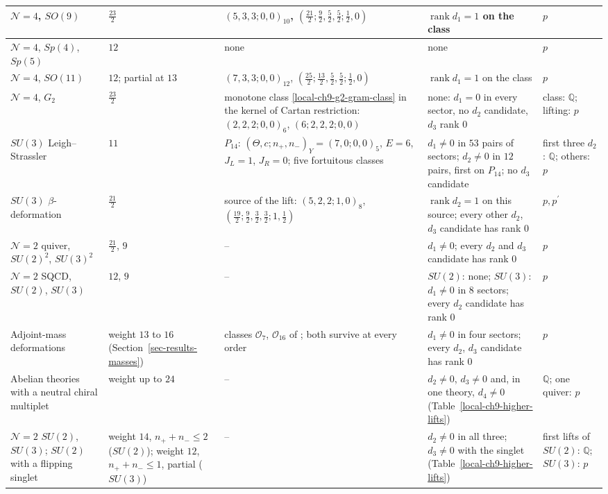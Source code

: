 \documentclass[11pt]{article}
\numberwithin{equation}{section}
\numberwithin{figure}{section}
\numberwithin{table}{section}
\begin{document}
{\begin{xltabular}{\linewidth}{|>{\raggedright\arraybackslash}p{2.3cm}|>{\raggedright\arraybackslash}p{2.2cm}|>{\raggedright\arraybackslash}X|>{\raggedright\arraybackslash}X|>{\raggedright\arraybackslash}p{1.75cm}|}
\hline
$\mathcal N=4$, $SO(9)$ & $\tfrac{23}2$ & $(5,3,3;0,0)_{10}$, $(\tfrac{21}2;\tfrac92,\tfrac52,\tfrac52;\tfrac12,0)$ & $\operatorname{rank}d_1=1$ on the class & $p$\\
\hline
$\mathcal N=4$, $Sp(4)$, $Sp(5)$ & $12$ & none & none & $p$\\
\hline
$\mathcal N=4$, $SO(11)$ & $12$; partial at $13$ & $(7,3,3;0,0)_{12}$, $(\tfrac{25}2;\tfrac{13}2,\tfrac52,\tfrac52;\tfrac12,0)$ & $\operatorname{rank}d_1=1$ on the class & $p$\\
\hline
$\mathcal N=4$, $G_2$ & $\tfrac{23}2$ & monotone class \eqref{local-ch9-g2-gram-class} in the kernel of Cartan restriction: $(2,2,2;0,0)_6$, $(6;2,2,2;0,0)$ & none: $d_1=0$ in every sector, no $d_2$ candidate, $d_3$ rank $0$ & class: $\mathbb Q$; lifting: $p$\\
\hline
$SU(3)$ Leigh--Strassler & $11$ & $P_{14}$: $(\Theta,c;n_+,n_-)_Y=(7,0;0,0)_5$, $E=6$, $J_L=1$, $J_R=0$; five fortuitous classes & $d_1\ne0$ in $53$ pairs of sectors; $d_2\ne0$ in $12$ pairs, first on $P_{14}$; no $d_3$ candidate & first three $d_2$: $\mathbb Q$; others: $p$\\
\hline
$SU(3)$ $\beta$-deformation & $\tfrac{21}2$ & source of the lift: $(5,2,2;1,0)_8$, $(\tfrac{19}2;\tfrac92,\tfrac32,\tfrac32;1,\tfrac12)$ & $\operatorname{rank}d_2=1$ on this source; every other $d_2$, $d_3$ candidate has rank $0$ & $p,p^{\prime}$\\
\hline
$\mathcal N=2$ quiver, $SU(2)^2$, $SU(3)^2$ & $\tfrac{21}2$, $9$ & -- & $d_1\ne0$; every $d_2$ and $d_3$ candidate has rank $0$ & $p$\\
\hline
$\mathcal N=2$ SQCD, $SU(2)$, $SU(3)$ & $12$, $9$ & -- & $SU(2)$: none; $SU(3)$: $d_1\ne0$ in $8$ sectors; every $d_2$ candidate has rank $0$ & $p$\\
\hline
Adjoint-mass deformations & weight $13$ to $16$ (Section~\ref{sec-results-masses}) & classes $\mathcal O_7$, $\mathcal O_{16}$ of \cite{CK}; both survive at every order & $d_1\ne0$ in four sectors; every $d_2$, $d_3$ candidate has rank $0$ & $p$\\
\hline
Abelian theories with a neutral chiral multiplet & weight up to $24$ \cite[results report, \S8]{Repo} & -- & $d_2\ne0$, $d_3\ne0$ and, in one theory, $d_4\ne0$ (Table~\ref{local-ch9-higher-lifts}) & $\mathbb Q$; one quiver: $p$\\
\hline
$\mathcal N=2$ $SU(2)$, $SU(3)$; $SU(2)$ with a flipping singlet & weight $14$, $n_++n_-\le2$ ($SU(2)$); weight $12$, $n_++n_-\le1$, partial ($SU(3)$) & -- & $d_2\ne0$ in all three; $d_3\ne0$ with the singlet (Table~\ref{local-ch9-higher-lifts}) & first lifts of $SU(2)$: $\mathbb Q$; $SU(3)$: $p$\\
\hline
\end{xltabular}}
\end{document}
